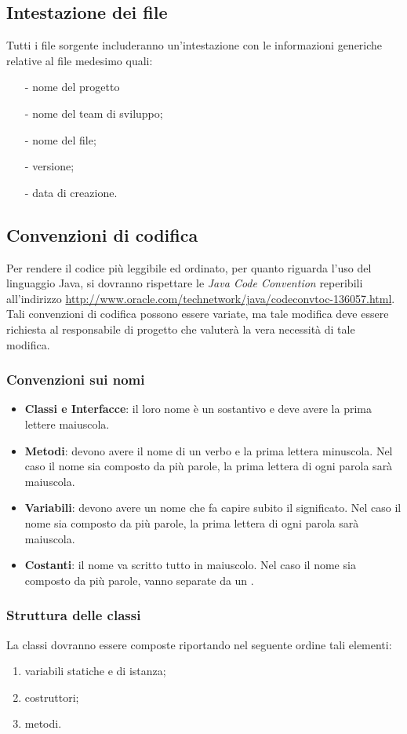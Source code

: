 {\subsection{Intestazione dei file}
Tutti i file sorgente includeranno un'intestazione con le informazioni generiche relative al file medesimo quali:
\begin{itemize}
\item[-] nome del progetto
\item[-] nome del team di sviluppo;
\item[-] nome del file;
\item[-] versione;
\item[-] data di creazione.
\end{itemize}
\subsection{Convenzioni di codifica}
Per rendere il codice più leggibile ed ordinato, per quanto riguarda l'uso del linguaggio Java, si dovranno rispettare le \textit{Java Code Convention} reperibili all'indirizzo \url{http://www.oracle.com/technetwork/java/codeconvtoc-136057.html}. 
Tali convenzioni di codifica possono essere variate, ma tale modifica deve essere richiesta al responsabile di progetto che valuterà la vera necessità di tale modifica.

\subsubsection{Convenzioni sui nomi}
\begin{itemize}
\item \textbf{Classi e Interfacce}: il loro nome è un sostantivo e deve avere la prima lettere maiuscola.
\item \textbf{Metodi}: devono avere il nome di un verbo e la prima lettera minuscola. Nel caso il nome sia composto da più parole, la prima lettera di ogni parola sarà maiuscola.
\item \textbf{Variabili}: devono avere un nome che fa capire subito il significato. Nel caso il nome sia composto da più parole, la prima lettera di ogni parola sarà maiuscola.
\item \textbf{Costanti}: il nome va scritto tutto in maiuscolo. Nel caso il nome sia composto da più parole, vanno separate da un .

\end{itemize}

\subsubsection{Struttura delle classi}
La classi dovranno essere composte riportando nel seguente ordine tali elementi:
\begin{enumerate}
\item variabili statiche e di istanza;
\item costruttori;
\item metodi.
\end{enumerate}

}
